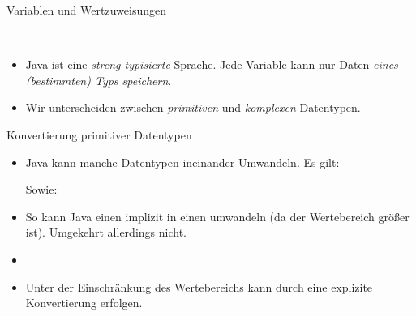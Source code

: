 \begin{frame}{Variablen und Wertzuweisungen}
    \pause{}
    \begin{center}
        \parbox{7cm}{\!\\
        }
    \end{center}
    \begin{itemize}[<+(1)->]
        \widei
        \item Java ist eine \emph{streng typisierte} Sprache.\pause{} Jede Variable kann nur Daten \emph{eines (bestimmten) Typs speichern}.
        \item Wir unterscheiden zwischen \emph{primitiven} und \emph{komplexen} Datentypen. 
    \end{itemize}
\end{frame}

\begin{frame}{Konvertierung primitiver Datentypen}
    \begin{itemize}[<+(1)->]
        \widei
        \item Java kann manche Datentypen ineinander Umwandeln.\pause{} Es gilt:\pause{}
        \begin{center}
             \mprec{}  \mprec{}  \mprec{}  \mprec{}  \mprec{} 
        \end{center}
        \pause{}Sowie:\pause{}
        \begin{center}
             \mprec{} 
        \end{center}
        \item So kann Java einen  implizit in einen  umwandeln\pause{} (da der Wertebereich größer ist).\pause{} Umgekehrt allerdings nicht.
        \item {}
        \item Unter der Einschränkung des Wertebereichs kann durch  eine explizite Konvertierung erfolgen.
    \end{itemize}
\end{frame}


